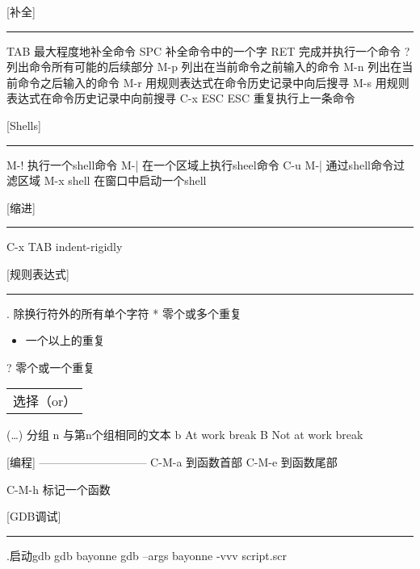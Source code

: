 \documentclass[11pt]{article}
\begin{document}
[补全]
\hrule
TAB                    最大程度地补全命令                     
SPC                    补全命令中的一个字                     
RET                    完成并执行一个命令                     
?                      列出命令所有可能的后续部分               
M-p                    列出在当前命令之前输入的命令             
M-n                    列出在当前命令之后输入的命令             
M-r                    用规则表达式在命令历史记录中向后搜寻         
M-s                    用规则表达式在命令历史记录中向前搜寻         
C-x ESC ESC            重复执行上一条命令                     




[Shells]
\hrule
M-!                    执行一个shell命令                     
M-|                    在一个区域上执行sheel命令               
C-u M-|                通过shell命令过滤区域                   
M-x shell              在窗口中启动一个shell                   



[缩进]
\hrule
C-x TAB                indent-rigidly



[规则表达式]
\hrule
.                      除换行符外的所有单个字符                 
 *                      零个或多个重复                       
\begin{itemize}
\item 一个以上的重复
\end{itemize}
?                      零个或一个重复                      

\begin{center}
\begin{tabular}{l}
 选择（or）  \\
\end{tabular}
\end{center}


(…)                    分组                             
n                      与第n个组相同的文本                   
b                      At work break                         
B                      Not at work break



[编程]
-----------------------------                  
C-M-a                  到函数首部                         
C-M-e                  到函数尾部

C-M-h                  标记一个函数 



[GDB调试]
\hrule
.启动gdb
 gdb bayonne
 gdb --args bayonne -vvv script.scr
\end{document}
